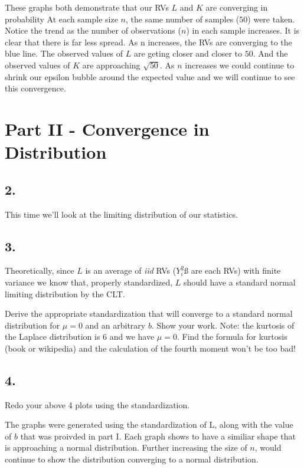 \documentclass[12pt]{article}
\begin{document}
These graphs both demonstrate that our RVs $L$ and $K$ are converging in probability At each sample size $n$, the same number of samples ($50$) were taken.  Notice the trend as the number of observations ($n$) in each sample increases. It is clear that there is far less spread. As n increases, the RVs are converging to the blue line. The observed values of $L$ are geting closer and closer to $50$. And the observed values of $K$ are approaching $\sqrt{50}$.  As $n$ increases we could continue to shrink our epsilon bubble around the expected value and we will continue to see this convergence.


\section{Part II - Convergence in Distribution}

\subsection{2.}
This time we’ll look at the limiting distribution of our statistics.

\subsection{3.}
Theoretically, since $L$ is an average of \textit{iid} RVs ($Y_i^2$ß are each RVs) with finite variance
we know that, properly standardized, $L$ should have a standard normal limiting distribution by the CLT. 

Derive the appropriate standardization that will converge to a standard normal distribution for $\mu = 0$ and an arbitrary $b$. Show your work. Note: the kurtosis of the
Laplace distribution is 6 and we have $\mu = 0$. Find the formula for kurtosis (book or
wikipedia) and the calculation of the fourth moment won’t be too bad!

\subsection{4.}
Redo your above 4 plots using the standardization.

The graphs were generated using the standardization of L, along with the value of $b$ that was proivded in part I. Each graph shows to have a similiar shape that is approaching a normal distribution. Further increasing the size of $n$, would continue to show the distribution converging to a normal distribution. 
\end{document}
